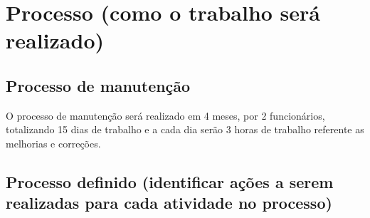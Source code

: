 \chapter{Processo (como o trabalho será realizado)}

\section{Processo de manutenção}
O processo de manutenção será realizado em 4 meses, por 2 funcionários, totalizando 15 dias de trabalho e a cada dia serão 3 horas de trabalho referente as melhorias e correções.
\section{Processo definido (identificar ações a serem realizadas para cada atividade no processo)}
